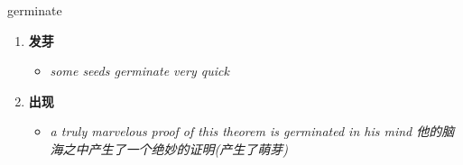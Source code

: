 
\begin{frame}
{\huge germinate}
\begin{center}
\begin{enumerate}\Large
  \item \textbf{发芽}
  \begin{itemize}
    \item \em{\Large{some seeds germinate very quick}}
  \end{itemize}
  \item \textbf{出现}
  \begin{itemize}
    \item \em{\Large{a truly marvelous proof of this theorem is germinated in his mind 他的脑海之中产生了一个绝妙的证明(产生了萌芽)}}
  \end{itemize}
\end{enumerate}
\end{center}
\end{frame}
